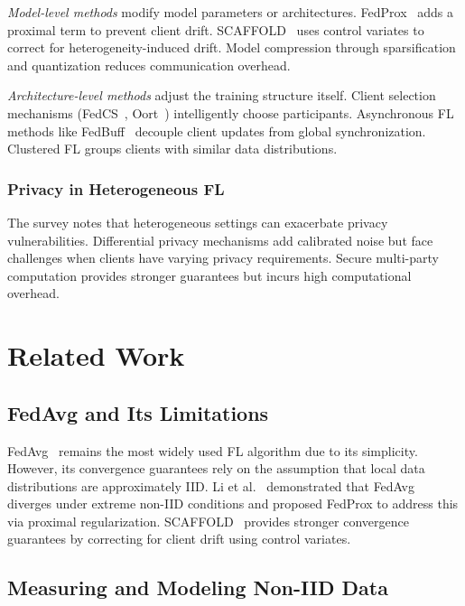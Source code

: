 \documentclass[journal]{IEEEtran}
\begin{document}
\textit{Model-level methods} modify model parameters or architectures. FedProx~\cite{li2020federated} adds a proximal term to prevent client drift. SCAFFOLD~\cite{karimireddy2020scaffold} uses control variates to correct for heterogeneity-induced drift. Model compression through sparsification and quantization reduces communication overhead.

\textit{Architecture-level methods} adjust the training structure itself. Client selection mechanisms (FedCS~\cite{nishio2019client}, Oort~\cite{lai2021oort}) intelligently choose participants. Asynchronous FL methods like FedBuff~\cite{nguyen2022federated} decouple client updates from global synchronization. Clustered FL groups clients with similar data distributions.

\subsubsection{Privacy in Heterogeneous FL}

The survey notes that heterogeneous settings can exacerbate privacy vulnerabilities. Differential privacy mechanisms add calibrated noise but face challenges when clients have varying privacy requirements. Secure multi-party computation provides stronger guarantees but incurs high computational overhead.


\section{Related Work}
\label{sec:related}

\subsection{FedAvg and Its Limitations}

FedAvg~\cite{mcmahan2017communication} remains the most widely used FL algorithm due to its simplicity. However, its convergence guarantees rely on the assumption that local data distributions are approximately IID. Li et al.~\cite{li2020federated} demonstrated that FedAvg diverges under extreme non-IID conditions and proposed FedProx to address this via proximal regularization. SCAFFOLD~\cite{karimireddy2020scaffold} provides stronger convergence guarantees by correcting for client drift using control variates.

\subsection{Measuring and Modeling Non-IID Data}
\end{document}
